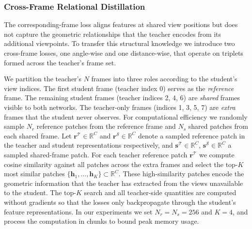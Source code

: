 \subsubsection{Cross-Frame Relational Distillation}

The corresponding-frame loss aligns features at shared view positions but does not capture the geometric relationships that the teacher encodes from its additional viewpoints. To transfer this structural knowledge we introduce two cross-frame losses, one angle-wise and one distance-wise, that operate on triplets formed across the teacher's frame set.

We partition the teacher's $N$ frames into three roles according to the student's view indices. The first student frame (teacher index 0) serves as the \emph{reference} frame. The remaining student frames (teacher indices 2, 4, 6) are \emph{shared} frames visible to both networks. The teacher-only frames (indices 1, 3, 5, 7) are \emph{extra} frames that the student never observes. For computational efficiency we randomly sample $N_r$ reference patches from the reference frame and $N_s$ shared patches from each shared frame. Let $\mathbf{r}^{\mathcal{T}} \in \mathbb{R}^{C}$ and $\mathbf{r}^{\mathcal{S}} \in \mathbb{R}^{C}$ denote a sampled reference patch in the teacher and student representations respectively, and $\mathbf{s}^{\mathcal{T}} \in \mathbb{R}^{C}$, $\mathbf{s}^{\mathcal{S}} \in \mathbb{R}^{C}$ a sampled shared-frame patch. For each teacher reference patch $\mathbf{r}^{\mathcal{T}}$ we compute cosine similarity against all patches across the extra frames and select the top-$K$ most similar patches $\{\mathbf{h}_1, \ldots, \mathbf{h}_K\} \subset \mathbb{R}^{C}$. These high-similarity patches encode the geometric information that the teacher has extracted from the views unavailable to the student. The top-$K$ search and all teacher-side quantities are computed without gradients so that the losses only backpropagate through the student's feature representations. In our experiments we set $N_r = N_s = 256$ and $K = 4$, and process the computation in chunks to bound peak memory usage.

